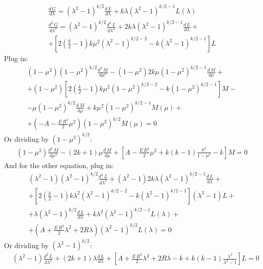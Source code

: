 \begin{equation}
\begin{split}
& \frac{d\,G}{d\lambda} =  (\lambda^2-1)^{k/2}\frac{d\,L}{d\lambda} + k\lambda(\lambda^2-1)^{k/2-1}L(\lambda) \\[.8em]
& \frac{d^2\,G}{d\lambda^2} =  (\lambda^2-1)^{k/2}\frac{d^2\,L}{d\lambda^2} + 2k\lambda(\lambda^2-1)^{k/2-1}\frac{d\,L}{d\lambda} + \\[.8em]
& + \left[2\left(\frac{k}{2}-1\right)k\mu^2\left(\lambda^2-1\right)^{k/2-2} - k(\lambda^2-1)^{k/2-1}\right]L
\end{split}
\end{equation}
Plug in:
\begin{equation}
\begin{split}
& (1-\mu^2)(1-\mu^2)^{k/2}\frac{d^2\,M}{d\mu^2}  - (1-\mu^2)2k\mu(1-\mu^2)^{k/2-1}\frac{d\,M}{d\mu}  + \\[.8em]
& + (1-\mu^2)\left[2\left(\frac{k}{2}-1\right)k\mu^2\left(1-\mu^2\right)^{k/2-2} - k(1 - \mu^2)^{k/2-1}\right]M - \\[.8em]
& - \mu (1-\mu^2)^{k/2}\frac{d\,M}{d\mu} +  k\mu^2(1-\mu^2)^{k/2-1}M(\mu) + \\[.8em]
& + \left(-A -  \frac{E\,R^2}{2}\mu^2  \right) (1-\mu^2)^{k/2}M(\mu)  = 0
\end{split}
\end{equation}
Or dividing by $ (1-\mu^2)^{k/2} $:
\begin{equation}
\begin{split}
& (1-\mu^2)\frac{d^2\,M}{d\mu^2} - (2k+1)\mu\frac{d\,M}{d\mu} +   \left[ A -  \frac{E\,R^2}{2}\mu^2  + k(k-1)\frac{\mu^2}{1-\mu^2} - k  \right]M = 0
\end{split}
\end{equation}
And for the other equation, plug in:
\begin{equation}
\begin{split}
&  (\lambda^2-1)(\lambda^2-1)^{k/2}\frac{d^2\,L}{d\lambda^2} +  (\lambda^2-1)2k\lambda(\lambda^2-1)^{k/2-1}\frac{d\,L}{d\lambda} + \\[.8em]
& + \left[2\left(\frac{k}{2}-1\right)k\lambda^2\left(\lambda^2-1\right)^{k/2-2} - k(\lambda^2-1)^{k/2-1}\right](\lambda^2-1)L + \\[.8em]
& + \lambda (\lambda^2-1)^{k/2}\frac{d\,L}{d\lambda} + k\lambda^2(\lambda^2-1)^{k/2-1}L(\lambda)  + \\[.8em]
& +  \left(A + \frac{E\,R^2}{2}\lambda^2 + 2R\lambda  \right) (\lambda^2-1)^{k/2}L(\lambda) = 0
\end{split}
\end{equation}
Or dividing by $ (\lambda^2 - 1)^{k/2} $:
\begin{equation}
\begin{split}
& (\lambda^2-1)\frac{d^2\,L}{d\lambda^2} + (2k+1)\lambda \frac{d\,L}{d\lambda} +  \left[A + \frac{E\,R^2}{2}\lambda^2 + 2R\lambda  -k + k(k-1)\frac{\lambda^2}{\lambda^2-1} \right]L = 0
\end{split}
\end{equation}

